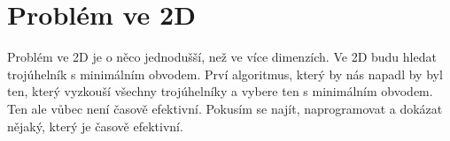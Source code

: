 \chapter{Problém ve 2D}
\label{chap:problem2d}
Problém ve 2D je o něco jednodušší, než ve více dimenzích. Ve 2D budu hledat trojúhelník s minimálním obvodem. Prví algoritmus, který by nás napadl by byl ten, který vyzkouší všechny trojúhelníky a vybere ten s minimálním obvodem. Ten ale vůbec není časově efektivní. Pokusím se najít, naprogramovat a dokázat nějaký, který je časově efektivní. 



